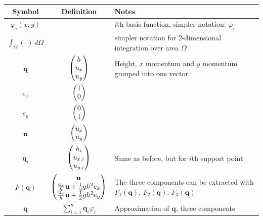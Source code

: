 \documentclass[a4paper, twoside]{article}
\renewcommand{\phi}{\varphi}
\begin{document}
\newenvironment{meine}{}{}
\newcommand{\mypmatrix}[1]
{
  \begin{meine}
    \renewcommand{\arraystretch}{1}
    \begin{pmatrix}
      #1
    \end{pmatrix}
    \renewcommand{\arraystretch}{2}
  \end{meine}
}

\begin{center}
  \begin{longtable}[ht!]{ccp{8cm}}
    \toprule
    Symbol & Definition & Notes \\
    \midrule{}

    $\phi_i(x,y)$ & & $i$th basis function, simpler notation: $\phi_i$ \\

    $\int_\Omega (\cdot)\, d\Omega$ & & simpler notation for 2-dimensional integration over area $\Omega$ \\

    $\mathbf{q}$ & $\mypmatrix{
      h \\ u_x \\ u_y
    }$ & Height, $x$ momentum and $y$ momentum grouped into one vector \\

    $e_x$ & $\mypmatrix{ 1 \\ 0 }$ & \\
    $e_y$ & $\mypmatrix{ 0 \\ 1 }$ & \\

    $\mathbf{u}$ & $ \mypmatrix{ u_x \\ u_y }$ & \\

    $\mathbf{q}_i$ & $\mypmatrix{
      h_i \\ u_{x,i} \\ u_{y,i}
    }$ & Same as before, but for $i$th support point  \\

    $F(\mathbf{q})$ &
    $\mypmatrix{ \mathbf{u} \\ \frac{u_x}{h}\mathbf{u} + \frac{1}{2} g h^2 e_x \\ \frac{u_y}{h}\mathbf{u} + \frac{1}{2} g h^2 e_y }$ &
    The three components can be extracted with $F_1(\mathbf{q})$, $F_2(\mathbf{q})$, $F_3(\mathbf{q})$ \\

    $\mathbf{q}$ & $\sum_{i=1}^n \mathbf{q}_i \phi_i$ & Approximation of $\mathbf{q}$, three components \\


\end{longtable}
\end{center}
\end{document}
